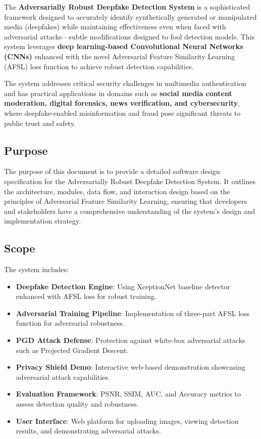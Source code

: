 \documentclass[a4paper,12pt]{article}
\begin{document}
The \textbf{Adversarially Robust Deepfake Detection System} is a sophisticated framework designed to accurately identify synthetically generated or manipulated media (deepfakes) while maintaining effectiveness even when faced with adversarial attacks—subtle modifications designed to fool detection models. This system leverages \textbf{deep learning-based Convolutional Neural Networks (CNNs)} enhanced with the novel Adversarial Feature Similarity Learning (AFSL) loss function to achieve robust detection capabilities.

The system addresses critical security challenges in multimedia authentication and has practical applications in domains such as \textbf{social media content moderation, digital forensics, news verification, and cybersecurity}, where deepfake-enabled misinformation and fraud pose significant threats to public trust and safety.

\subsection{Purpose}
The purpose of this document is to provide a detailed software design specification for the Adversarially Robust Deepfake Detection System. It outlines the architecture, modules, data flow, and interaction design based on the principles of Adversarial Feature Similarity Learning, ensuring that developers and stakeholders have a comprehensive understanding of the system's design and implementation strategy.

\subsection{Scope}
The system includes:
\begin{itemize}
    \item \textbf{Deepfake Detection Engine}: Using XceptionNet baseline detector enhanced with AFSL loss for robust training.
    \item \textbf{Adversarial Training Pipeline}: Implementation of three-part AFSL loss function for adversarial robustness.
    \item \textbf{PGD Attack Defense}: Protection against white-box adversarial attacks such as Projected Gradient Descent.
    \item \textbf{Privacy Shield Demo}: Interactive web-based demonstration showcasing adversarial attack capabilities.
    \item \textbf{Evaluation Framework}: PSNR, SSIM, AUC, and Accuracy metrics to assess detection quality and robustness.
    \item \textbf{User Interface}: Web platform for uploading images, viewing detection results, and demonstrating adversarial attacks.
\end{itemize}
\end{document}
